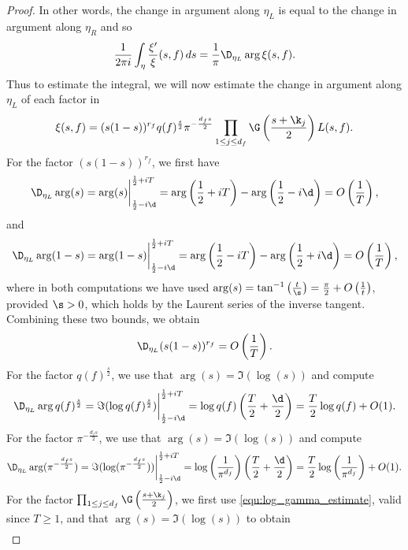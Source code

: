 \begin{proof}
      In other words, the change in argument along $\eta_{L}$ is equal to the change in argument along $\eta_{R}$ and so
      \[
        \frac{1}{2\pi i}\int_{\eta}\frac{\xi'}{\xi}(s,f)\,ds = \frac{1}{\pi}\D_{\eta_{L}}\arg\xi(s,f).
      \]
      Thus to estimate the integral, we will now estimate the change in argument along $\eta_{L}$ of each factor in
      \[
        \xi(s,f) = (s(1-s))^{r_{f}}q(f)^{\frac{s}{2}}\pi^{-\frac{d_{f}s}{2}}\prod_{1 \le j \le d_{f}}\G\left(\frac{s+\k_{j}}{2}\right)L(s,f).
      \]
      For the factor $(s(1-s))^{r_{f}}$, we first have
      \[
        \D_{\eta_{L}}\arg(s) = \arg(s)\bigg|_{\frac{1}{2}-i\d}^{\frac{1}{2}+iT} = \arg\left(\frac{1}{2}+iT\right)-\arg\left(\frac{1}{2}-i\d\right) = O\left(\frac{1}{T}\right),
      \]
      and
      \[
        \D_{\eta_{L}}\arg(1-s) = \arg(1-s)\bigg|_{\frac{1}{2}-i\d}^{\frac{1}{2}+iT} = \arg\left(\frac{1}{2}-iT\right)-\arg\left(\frac{1}{2}+i\d\right) = O\left(\frac{1}{T}\right),
      \]
      where in both computations we have used $\arg(s) = \tan^{-1}\left(\frac{t}{\s}\right) = \frac{\pi}{2}+O\left(\frac{1}{t}\right)$, provided $\s > 0$, which holds by the Laurent series of the inverse tangent. Combining these two bounds, we obtain
      \begin{equation}\label{equ:zero_counting_1}
        \D_{\eta_{L}}(s(1-s))^{r_{f}} = O\left(\frac{1}{T}\right).
      \end{equation}
      For the factor $q(f)^{\frac{s}{2}}$, we use that $\arg(s) = \Im(\log(s))$ and compute
      \begin{equation}\label{equ:zero_counting_2}
        \D_{\eta_{L}}\arg{q(f)^{\frac{s}{2}}} = \Im(\log{q(f)^{\frac{s}{2}}})\bigg|_{\frac{1}{2}-i\d}^{\frac{1}{2}+iT} = \log{q(f)}\left(\frac{T}{2}+\frac{\d}{2}\right) = \frac{T}{2}\log{q(f)}+O(1).
      \end{equation}
      For the factor $\pi^{-\frac{d_{f}s}{2}}$, we use that $\arg(s) = \Im(\log(s))$ and compute
      \begin{equation}\label{equ:zero_counting_3}
        \D_{\eta_{L}}\arg(\pi^{-\frac{d_{f}s}{2}}) = \Im(\log(\pi^{-\frac{d_{f}s}{2}}))\bigg|_{\frac{1}{2}-i\d}^{\frac{1}{2}+iT} = \log\left(\frac{1}{\pi^{d_{f}}}\right)\left(\frac{T}{2}+\frac{\d}{2}\right) = \frac{T}{2}\log\left(\frac{1}{\pi^{d_{f}}}\right)+O(1).
      \end{equation}
      For the factor $\prod_{1 \le j \le d_{f}}\G\left(\frac{s+\k_{j}}{2}\right)$, we first use \cref{equ:log_gamma_estimate}, valid since $T \ge 1$, and that $\arg(s) = \Im(\log(s))$ to obtain
      \begin{align*}

\end{align*}
\end{proof}
